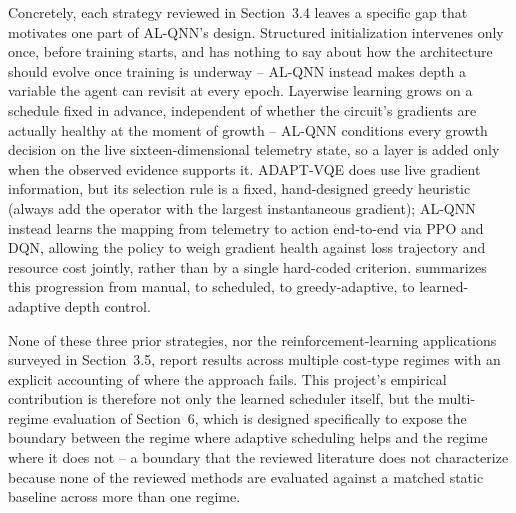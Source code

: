 Concretely, each strategy reviewed in Section~3.4 leaves a specific gap that motivates one part of AL-QNN's design. Structured initialization \citep{grant2019initialization} intervenes only once, before training starts, and has nothing to say about how the architecture should evolve once training is underway -- AL-QNN instead makes depth a variable the agent can revisit at every epoch. Layerwise learning grows on a schedule fixed in advance, independent of whether the circuit's gradients are actually healthy at the moment of growth -- AL-QNN conditions every growth decision on the live sixteen-dimensional telemetry state, so a layer is added only when the observed evidence supports it. ADAPT-VQE \citep{grimsley2019adaptive} does use live gradient information, but its selection rule is a fixed, hand-designed greedy heuristic (always add the operator with the largest instantaneous gradient); AL-QNN instead learns the mapping from telemetry to action end-to-end via PPO and DQN, allowing the policy to weigh gradient health against loss trajectory and resource cost jointly, rather than by a single hard-coded criterion.  summarizes this progression from manual, to scheduled, to greedy-adaptive, to learned-adaptive depth control.

None of these three prior strategies, nor the reinforcement-learning applications surveyed in Section~3.5, report results across multiple cost-type regimes with an explicit accounting of where the approach fails. This project's empirical contribution is therefore not only the learned scheduler itself, but the multi-regime evaluation of Section~6, which is designed specifically to expose the boundary between the regime where adaptive scheduling helps and the regime where it does not -- a boundary that the reviewed literature does not characterize because none of the reviewed methods are evaluated against a matched static baseline across more than one regime.

